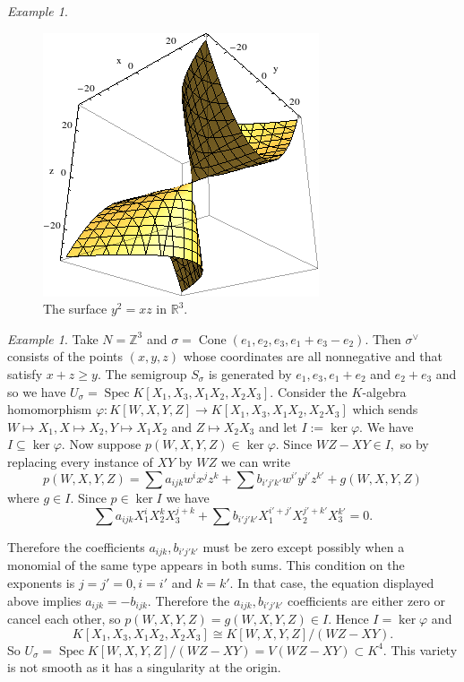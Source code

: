 \documentclass[BSc]{usydthesis}
\numberwithin{equation}{chapter}
\theoremstyle{remark}
\newtheorem{Example}[equation]{Example}
\newcommand{\R}{\mathbb{R}}
\newcommand{\Z}{\mathbb{Z}}
\newcommand{\V}{\vee}
\DeclareMathOperator{\Cone}{Cone}
\DeclareMathOperator{\Spec}{Spec}
\begin{document}
\begin{Example}
\begin{figure}[ht]
  \centering
   \includegraphics[scale=0.8,keepaspectratio=true]{./scone.png} \\
    The surface $y^2=xz$ in $\R^3.$
\end{figure}
 
\end{Example}

\begin{Example} Take $N=\Z^3$ and $\sigma = \Cone(e_1, e_2, e_3, e_1+e_3-e_2).$ Then $\sigma^{\V}$ consists of the points $(x,y,z)$ whose coordinates are all nonnegative and that satisfy $x+z\geq y.$ The semigroup $S_{\sigma}$ is generated by $e_1, e_3, e_1+e_2$ and $e_2+e_3$ and so we have $U_{\sigma} = \Spec K[X_1, X_3, X_1X_2, X_2X_3].$ Consider the $K$-algebra homomorphism $\varphi:K[W,X,Y,Z] \to K[X_1, X_3, X_1X_2, X_2X_3]$ which sends $W\mapsto X_1, X\mapsto X_2, Y\mapsto X_1X_2$ and $Z\mapsto X_2X_3$ and let $I:=\ker \varphi.$ We have $I\subseteq \ker \varphi.$ Now suppose $p(W,X,Y,Z)\in \ker \varphi.$ Since $WZ-XY \in I,$ so by replacing every instance of $XY$ by $WZ$ we can write $$p(W,X,Y,Z) = \sum a_{ijk} w^i x^j z^k + \sum b_{i'j'k'} w^{i'} y^{j'} z^{k'} + g(W,X,Y,Z)$$ where $g\in I.$ Since $p\in \ker I$ we have $$ \sum a_{ijk} X_1^i X_2^k X_3^{j+k} + \sum b_{i'j'k'} X_1^{i'+j'} X_2^{j'+k'} X_3^{k'} =0.$$

Therefore the coefficients $a_{ijk}, b_{i'j'k'}$ must be zero except possibly when a monomial of the same type appears in both sums. This condition on the exponents is $j=j'=0, i=i'$ and $k=k'.$ In that case, the equation displayed above implies $a_{ijk} = -b_{ijk}.$ Therefore the $a_{ijk}, b_{i'j'k'}$ coefficients are either zero or cancel each other, so $p(W,X,Y,Z) = g(W,X,Y,Z)\in I.$ Hence $I=\ker \varphi$ and $$ K[X_1, X_3, X_1X_2, X_2X_3]\cong K[W,X,Y,Z]/(WZ-XY).$$ So $U_{\sigma} = \Spec K[W,X,Y,Z]/(WZ-XY) = V(WZ-XY)\subset K^4.$ This variety is not smooth as it has a singularity at the origin.
\end{Example}
\end{document}
